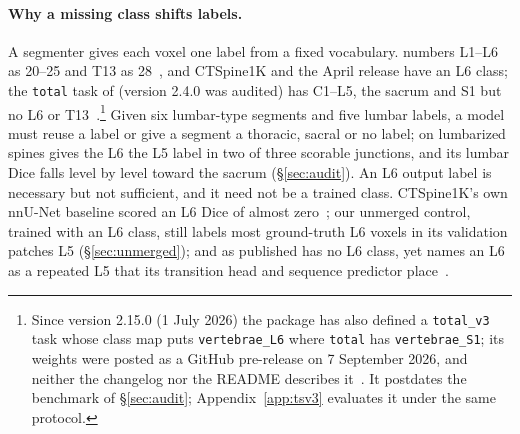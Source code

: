 \paragraph{Why a missing class shifts labels.}
A segmenter gives each voxel one label from a fixed vocabulary. \VerSe{} numbers L1--L6 as
20--25 and T13 as 28~\citep{VerSeRepo}, and CTSpine1K and the April release have an L6 class;
the \texttt{total} task of \TS{} (version 2.4.0 was audited) has C1--L5, the sacrum and S1 but
no L6 or T13~\citep{Wasserthal2023TotalSegmentator:Images,TotalSegmentatorCode}.\footnote{Since
version 2.15.0 (1 July 2026) the \TS{} package has also defined a \texttt{total\_v3} task whose
class map puts \texttt{vertebrae\_L6} where \texttt{total} has \texttt{vertebrae\_S1}; its
weights were posted as a GitHub pre-release on 7 September 2026, and neither the changelog
nor the README describes it~\citep{TotalSegmentatorCode}. It postdates the
benchmark of \S\ref{sec:audit}; Appendix~\ref{app:tsv3} evaluates it under the same protocol.} Given
six lumbar-type segments and five lumbar labels, a model must reuse a label or give a segment
a thoracic, sacral or no label; on lumbarized spines \TS{} gives the L6 the L5 label in two of
three scorable junctions, and its lumbar Dice falls level by level toward the sacrum
(\S\ref{sec:audit}). An L6 output label is necessary but not sufficient, and it need not be a
trained class. CTSpine1K's own nnU-Net baseline scored an L6 Dice of almost
zero~\citep{Deng2021CTSpine1K:Tomography}; our unmerged control, trained with an L6
class, still labels most ground-truth L6 voxels in its validation patches L5
(\S\ref{sec:unmerged}); and \VERIDAH{} as published has no L6 class, yet names an L6 as a
repeated L5 that its transition head and sequence predictor
place~\citep{Moller2026VERIDAH:Sequences}.
